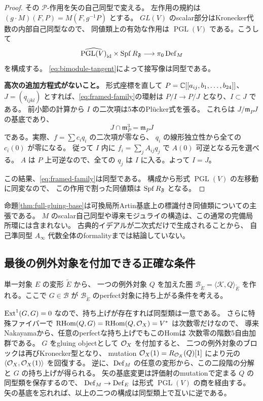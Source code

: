 \begin{proof}
その $\mathcal P$-作用を矢の自己同型で変える。
左作用の規約は $(g\cdot M)(F,P)=M(F,g^{-1}P)$ とする。
$GL(V)$ のscalar部分はKronecker代数の内部自己同型なので、
同値類上の有効な作用は $\operatorname{PGL}(V)$ である。こうして
\begin{equation}\label{eq:framed-family}
 \widehat{\operatorname{PGL}(V)}_{\operatorname{id}}\times\operatorname{Spf} R_{\mathfrak F}
 \longrightarrow\pi_0\operatorname{Def}_M
\end{equation}
を構成する。
\eqref{eq:bimodule-tangent}によって接写像は同型である。

\textbf{高次の追加方程式がないこと。}
形式座標を直して $P=\mathbb C[[a_{ij},b_1,\ldots,b_{24}]]$、
$J=(q_{ijkl})$ とすれば、\eqref{eq:framed-family}の環射は
$P/I\to P/J$ となり、$I\subset J$ である。
前小節の計算から $I$ の二次項は5本のPlücker式を張る。
これらは $J/\mathfrak m_PJ$ の基底であり、
\[
 J\cap\mathfrak m_P^3=\mathfrak m_PJ
\]
である。実際、$f=\sum c_iq_i$ の二次項が零なら、
$q_i$ の線形独立性から全ての $c_i(0)$ が零になる。
従って $I$ 内に $f_i=\sum_j A_{ij}q_j$ で $A(0)$ 可逆となる元を選べる。
$A$ は $P$ 上可逆なので、全ての $q_j$ は $I$ に入る。よって $I=J$。

この結果、\eqref{eq:framed-family}は同型である。
構成から形式 $\operatorname{PGL}(V)$ の左移動に同変なので、
この作用で割った同値類は $\operatorname{Spf} R_{\mathfrak F}$ となる。
\end{proof}

\begin{remark}[古典的基底と高次構造]
命題\ref{thm:full-gluing-base}は可換局所Artin基底上の標識付き同値類についての主張である。
$M$ のscalar自己同型や導来モジュライの構造は、この通常の完備局所環には含まれない。
古典的イデアルが二次式だけで生成されることから、
自己準同型 $A_\infty$ 代数全体のformalityまでは結論していない。
\end{remark}

\subsection{最後の例外対象を付加できる正確な条件}

単一対象 $E$ の変形 $\widetilde E$ から、
一つの例外対象 $Q$ を加えた圏
$\mathcal B_{\widetilde E}=\langle\mathcal K,Q\rangle_{\widetilde E}$
を作れる。ここで $G\in\mathcal B$ が
$\mathcal B_{\widetilde E}$ のperfect対象に持ち上がる条件を考える。

$\operatorname{Ext}^1(G,G)=0$ なので、持ち上げが存在すれば同型類は一意である。
さらに特殊ファイバーで
$\operatorname{RHom}(Q,G)=\operatorname{RHom}(Q,\mathcal O_X)=V^*$ は次数零だけなので、
導来Nakayamaから、任意のperfectな持ち上げでもこのHomは
次数零の階数5自由加群である。
$G$ をgluing objectとして $\mathcal O_X$ を付加すると、
二つの例外対象のブロックは再びKronecker型となり、
mutation $\mathcal O_X(1)=R_{\mathcal O_X}(Q)[1]$ により元の
$\langle\mathcal O_X,\mathcal O_X(1)\rangle$ を回復する。
逆に、$\operatorname{Def}_M$ の任意の変形から、この二段階の分解と $G$ の持ち上げが得られる。
矢の基底変更は評価射のmutationで定まる $Q$ の同型類を保存するので、
$\operatorname{Def}_M\to\operatorname{Def}_E$ は形式 $\operatorname{PGL}(V)$ の商を経由する。
矢の基底を忘れれば、以上の二つの構成は同型類上で互いに逆である。

